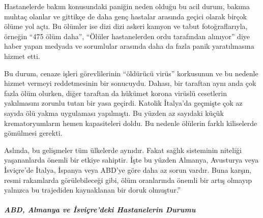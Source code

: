 Hastanelerde bakım konusundaki paniğin neden olduğu bu acil durum,
bakıma muhtaç olanlar ve gittikçe de daha genç hastalar arasında geçici
olarak birçok ölüme yol açtı. Bu ölümler ise dizi dizi askeri kamyon ve
tabut fotoğraflarıyla, örneğin ``475 ölüm daha'', ``Ölüler hastanelerden
ordu tarafından alınıyor'' diye haber yapan medyada ve sorumlular
arasında daha da fazla panik yaratılmasına hizmet etti.

Bu durum, cenaze işleri görevlilerinin ``öldürücü virüs'' korkusunun ve
bu nedenle hizmet vermeyi reddetmesinin bir sonucuydu. Dahası, bir
taraftan aynı anda çok fazla ölüm olurken, diğer taraftan da hükümet
korona virüslü cesetlerin yakılmasını zorunlu tutan bir yasa geçirdi.
Katolik İtalya'da geçmişte çok az sayıda ölü yakma uygulaması
yapılmıştı. Bu yüzden az sayıdaki küçük krematoryumların hemen
kapasiteleri doldu. Bu nedenle ölülerin farklı kiliselerde gömülmesi
gerekti.

Aslında, bu gelişmeler tüm ülkelerde aynıdır. Fakat sağlık sisteminin
niteliği yaşananlarda önemli bir etkiye sahiptir. İşte bu yüzden
Almanya, Avusturya veya İsviçre'de İtalya, İspanya veya ABD'ye göre daha
az sorun vardır. Buna karşın, resmi rakamlarda görülebileceği gibi, ölüm
oranlarında önemli bir artış olmayıp yalnızca bu trajediden kaynaklanan
bir doruk olmuştur.''\\

\hypertarget{abd-almanya-ve-isviuxe7redeki-hastanelerin-durumu}{%
\subparagraph{\texorpdfstring{\textbf{ABD, Almanya ve İsviçre'deki
Hastanelerin
Durumu}}{ABD, Almanya ve İsviçre'deki Hastanelerin Durumu}}\label{abd-almanya-ve-isviuxe7redeki-hastanelerin-durumu}}

